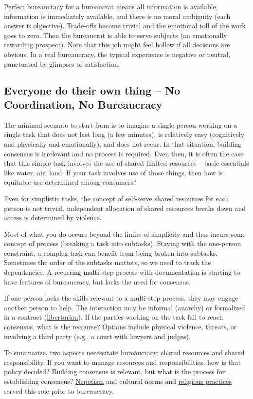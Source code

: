 Perfect bureaucracy for a bureaucrat means all information is available, information is immediately available, and there is no moral ambiguity (each answer is objective). Trade-offs become trivial and the emotional toll of the work goes to zero. Then the bureaucrat is able to serve subjects (an emotionally rewarding prospect). Note that this job might feel hollow if all decisions are obvious. In a real bureaucracy, the typical experience is negative or neutral, punctuated by glimpses of satisfaction. 

\subsection{Everyone do their own thing -- No Coordination, No Bureaucracy}
The minimal scenario to start from is to imagine a single person working on a single task that does not last long (a few minutes), is relatively easy (cognitively and physically and emotionally), and does not recur. In that situation, building consensus is irrelevant and no process is required. Even then, it is often the case that this simple task involves the use of shared limited resources -- basic essentials like water, air, land. If your task involves use of those things, then how is equitable use determined among consumers?

Even for simplistic tasks, the concept of self-serve shared resources for each person is not trivial. independent allocation of shared resources breaks down and access is determined by violence.

Most of what you do occurs beyond the limits of simplicity and thus incurs some concept of \gls{process} (breaking a task into subtasks). Staying with the one-person constraint, a complex task can benefit from being broken into subtasks. Sometimes the order of the subtasks matters, so we need to track the dependencies. A recurring multi-step process with documentation is starting to have features of bureaucracy, but lacks the need for consensus. 


If one person lacks the skills relevant to a multi-step process, they may engage another person to help. The interaction may be informal (anarchy) or formalized in a contract (\href{https://en.wikipedia.org/wiki/Libertarianism}{libertarian}). If the parties working on the task fail to reach consensus, what is the recourse? Options include physical violence, threats, or involving a third party (e.g., a court with lawyers and judges). 


To summarize, two aspects necessitate bureaucracy: shared resources and shared responsibility. 
If you want to manage resources and responsibilities, how is that policy decided?  Building consensus is relevant, but what is the process for establishing consensus? \href{https://en.wikipedia.org/wiki/Nepotism}{Nepotism} and cultural norms and \href{https://en.wikipedia.org/wiki/Religion}{religious practices} served this role prior to bureaucracy. 


